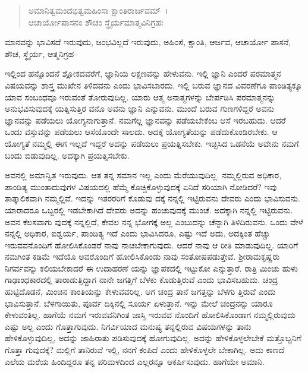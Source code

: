 \begin{verse}
ಅಮಾನಿತ್ವಮಂದಭಿತ್ವಮಹಿಂಸಾ ಕ್ಷಾಂತಿರಾರ್ಜವಮ್~।\\ಆಚಾರ್ಯೋಪಾಸನಂ ಶೌಚಂ ಸ್ಥೈರ್ಯಮಾತ್ಮವಿನಿಗ್ರಹಃ 
\end{verse}

{\small ಮಾನವನ್ನು ಭಾವಿಸದೆ ಇರುವುದು, ಜಂಭವಿಲ್ಲದೆ ಇರುವುದು, ಅಹಿಂಸೆ, ಕ್ಷಾಂತಿ, ಆರ್ಜವ, ಆಚಾರ್ಯೋ ಪಾಸನೆ, ಶೌಚ, ಸ್ಥೈರ್ಯ, ಆತ್ಮನಿಗ್ರಹ–}

ಇಲ್ಲಿಂದ ಹನ್ನೊಂದನೆ ಶ್ಲೋಕದವರೆಗೆ, ಜ್ಞಾನಿಯ ಲಕ್ಷಣವನ್ನು ಹೇಳುವನು. ಇಲ್ಲಿ ಜ್ಞಾನಿ ಎಂದರೆ ಪರಮಾತ್ಮನ ವಿಷಯವನ್ನು ಶಾಸ್ತ್ರ ಮುಖೇನ ತಿಳಿದವನು ಎಂದು ಭಾವಿಸಬಾರದು. ಇಲ್ಲಿ ಬರುವ ಜ್ಞಾನದ ವಿವರಣೆಗೂ ಪಾಂಡಿತ್ಯಕ್ಕೂ ಯಾವ ಸಂಬಂಧವೂ ಇರುವಂತೆ ತೋರುವುದಿಲ್ಲ. ಯಾರು ಆತ್ಮ ಅನಾತ್ಮಗಳನ್ನು ಬೇರ್ಪಡಿಸಿ ಪರಮಾತ್ಮನನ್ನು ಅನುಭವಿಸುವುದಕ್ಕೆ ಯತ್ನಿಸುತ್ತಿರ ವನೊ ಅವನು ಜ್ಞಾನಿ ಎನ್ನುವನು. ಮುಂದೆ ಬರುವ ಗುಣಗಳಿದ್ದರೆ ಅವನು ಜ್ಞಾನವನ್ನು ಪಡೆಯಲು ಯೋಗ್ಯನಾಗುತ್ತಾನೆ. ನಮಗೆಲ್ಲ ಜ್ಞಾನವನ್ನು ಪಡೆಯಬೇಕೆಂಬ ಆಸೆ ಇರಬಹುದು. ಆದರೆ ಒಂದು ವಸ್ತುವನ್ನು ಪಡೆಯಲು ಆಸೆಯೊಂದೇ ಸಾಲದು. ಅದಕ್ಕೆ ಯೋಗ್ಯತೆಯನ್ನು ಪಡೆದುಕೊಂಡಿರಬೇಕು. ಆ ಯೋಗ್ಯತೆ ನಮ್ಮಲ್ಲಿ ಈಗ ಇಲ್ಲದೆ ಇದ್ದರೆ ಅದನ್ನು ಪಡೆಯಲು ಪ್ರಯತ್ನಿಸಬೇಕು. ಇಚ್ಛಿಸಿದ ಒಡನೆಯೆ ಅವೇನು ನಮಗೆ ಬಂದು ಬಿಡುವುದಿಲ್ಲ. ಅದಕ್ಕಾಗಿ ಪ್ರಯತ್ನಿಸಬೇಕು.

ಅವನಲ್ಲಿ ಅಮಾನ್ವಿತ ಇರುವುದು. ಆತ ತನ್ನ ಸಮಾನ ಇಲ್ಲ ಎಂದು ಮೆರೆಯುವುದಿಲ್ಲ. ನಮ್ಮಲ್ಲಿರುವ ಅಧಿಕಾರ, ಪಾಂಡಿತ್ಯ ಮುಂತಾದುವುಗಳ ವಿಷಯದಲ್ಲಿ ಹೆಮ್ಮೆ ಕೊಚ್ಚಿಕೊಳ್ಳುವುದಕ್ಕೆ ಏನಿದೆ ಸರಿಯಾಗಿ ನೋಡಿದರೆ? ಇವು ತಾತ್ಕಾಲಿಕವಾಗಿ ನಮ್ಮಲ್ಲಿವೆ. ಇದನ್ನು ಇತರರರಿಗೆ ಕೊಡುವು ದಕ್ಕೆ ನನ್ನಲ್ಲಿ ಇಟ್ಟಿರುವನು ದೇವರು ಎಂದು ಭಾವಿಸುವನು. ಯಾರಾದರೂ ಒಬ್ಬರಲ್ಲಿ ಇಡಬೇಕಾಗಿದೆ ದೇವರು ಅದನ್ನು ಹಂಚುವುದಕ್ಕೆ ಮುಂಚೆ. ಅದಕ್ಕಾಗಿ ನನ್ನಲ್ಲಿ ಇಟ್ಟಿರುವನು. ಅವನ ಕೆಲಸವಾಗು ವುದಕ್ಕೆ ನನ್ನಲ್ಲಿದೆ, ಕೇವಲ ನನ್ನ ಭೋಗಕ್ಕೆ ಅಲ್ಲ ಎಂಬುದನ್ನು ಚೆನ್ನಾಗಿ ತಿಳಿದಿರುವನು. ಒಂದು ವೇಳೆ ನನ್ನಲ್ಲಿ ಅಧಿಕಾರ, ಐಶ್ವರ್ಯ, ಪಾಂಡಿತ್ಯ ಇದೆ ಎಂದು ಭಾವಿಸಿದರೂ, ಎಷ್ಟು ಇದೆ ಅದು. ಅದಕ್ಕಿಂತ ಹೆಚ್ಚು ಇರುವವನೊಂದಿಗೆ ಹೋಲಿಸಿಕೊಂಡರೆ ನಾವು ನಾಚಬೇಕಾಗುವುದು. ಆದರೆ ನಾವು ಆ ರೀತಿ ಮಾಡುವುದಿಲ್ಲ. ಯಾರಿಗೆ ನಮಗಿಂತ ಕಡಿಮೆ ಇದೆಯೊ ಅವರೊಂದಿಗೆ ಹೋಲಿಸಿಕೊಂಡು ನಾವು ಸಂತೋಷಪಡುತ್ತೇವೆ. ಶ‍್ರೀರಾಮಕೃಷ್ಣರು ನಿಗರ್ವವನ್ನು ಕಲಿಯಬೇಕಾದರೆ ಈ ಉದಾಹರಣೆ ಯನ್ನು ಜ್ಞಾಪಕದಲ್ಲಿ ಇಟ್ಟುಕೋ ಎನ್ನುತ್ತಾರೆ. ರಾತ್ರಿ ಮಿಂಚು ಹುಳು ಗಾಢಾಂಧಕಾರದಲ್ಲಿ ತಾರಾಡುತ್ತಿದ್ದಾಗ ನಾನೇ ಜಗತ್ತಿಗೆ ಬೆಳಕು ಕೊಡುತ್ತಿರುವೆ ಎಂದು ಭಾವಿಸಬಹುದು. ಚಂದ್ರ ಹುಟ್ಟಿದೊಡನೆ, ಮಿಂಚಿನ ಕಾಂತಿಯನ್ನು ಕೇಳುವವರಿಲ್ಲ. ಆಗ ಚಂದ್ರ ತಾನೆ ಜಗತ್ತನ್ನು ಬೆಳಗು ತ್ತಿರುವೆ ಎಂದು ಭಾವಿಸುತ್ತಾನೆ. ಬೆಳಗಾಯಿತು, ಪೂರ್ವ ದಿಕ್ಕಿನಲ್ಲಿ ಸೂರ್ಯ ಏಳುತ್ತಾನೆ. ಇನ್ನು ಮೇಲೆ ಚಂದ್ರನನ್ನು ಯಾರೂ ಕೇಳುವಂತಿಲ್ಲ. ಹಾಗೆಯೆ ನಮಗೆ ಇರುವವನಿಗಿಂತ ಜಾಸ್ತಿ ಇರುವವ ನೊಂದಿಗೆ ಹೋಲಿಸಿಕೊಂಡಾಗ ನಮ್ಮಲ್ಲಿರುವುದು ಎಷ್ಟು ಅಲ್ಪ ಎಂದು ಗೊತ್ತಾಗುವುದು. ನಿಗರ್ವಿಯಾದ ಮನುಷ್ಯ ತನ್ನಲ್ಲಿರುವ ವಿಷಯಗಳನ್ನು ತಾನು ಹೇಳಿಕೊಳ್ಳುವುದಿಲ್ಲ, ಅದನ್ನು ಜಾಹಿರಾತು ಪಡಿಸುವುದಕ್ಕೆ ಹೋಗುವುದಿಲ್ಲ. ಅದನ್ನು ಹೇಳಿಕೊಳ್ಳಲೇಬೇಕೆ ಮತ್ತೊಬ್ಬನಿಗೆ ಗೊತ್ತಾ ಗುವುದಕ್ಕೆ? ಮಲ್ಲಿಗೆ ತಾನಿರುವೆ ಇಲ್ಲಿ, ನನಗೆ ಕಂಪಿದೆ ಎಂದು ಹೇಳಿಕೊಳ್ಳಲೇ ಬೇಕಾಗಿಲ್ಲ. ಅದು ಕಾಣದೆ ಎಲೆಯ ಮರೆಯ ಹಿಂದಿದ್ದರೂ ತನ್ನ ಪರಿಮಳದಿಂದ ಎಲ್ಲರನ್ನೂ ಆಕರ್ಷಿಸುವುದು. ಹಾಗೆಯೇ ಅಮಾನಿ.

